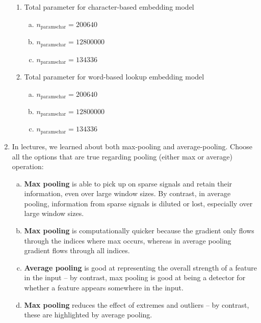 \begin{enumerate}[1.]
\begin{enumerate}[2a.]
\item {}

Total parameter for character-based embedding model

\begin{enumerate}[(a)]
\item $n_\text{paramschar} = 200640$
\item $n_\text{paramschar} = 12800000$
\item $n_\text{paramschar} = 134336$
\end{enumerate}


\item {}

Total parameter for word-based lookup embedding model

\begin{enumerate}[(a)]
\item $n_\text{paramschar} = 200640$
\item $n_\text{paramschar} = 12800000$
\item $n_\text{paramschar} = 134336$
\end{enumerate}

\end{enumerate}

\item {}

In lectures, we learned about both max-pooling and average-pooling. Choose all the options that are true regarding pooling (either max or average) operation:

\begin{enumerate}[(a)]
\item {\bf Max pooling} is able to pick up on sparse signals and retain their information, even over large window sizes. By contrast, in average pooling, information from sparse signals is diluted or lost, especially over large window sizes.
\item {\bf Max pooling} is computationally quicker because the gradient only flows through the indices where max occurs, whereas in average pooling gradient flows through all indices.
\item {\bf Average pooling} is good at representing the overall strength of a feature in the input -- by contrast, max pooling is good at being a detector for whether a feature appears somewhere in the input.
\item {\bf Max pooling} reduces the effect of extremes and outliers -- by contrast, these are highlighted by average pooling.
\end{enumerate}


\end{enumerate}
